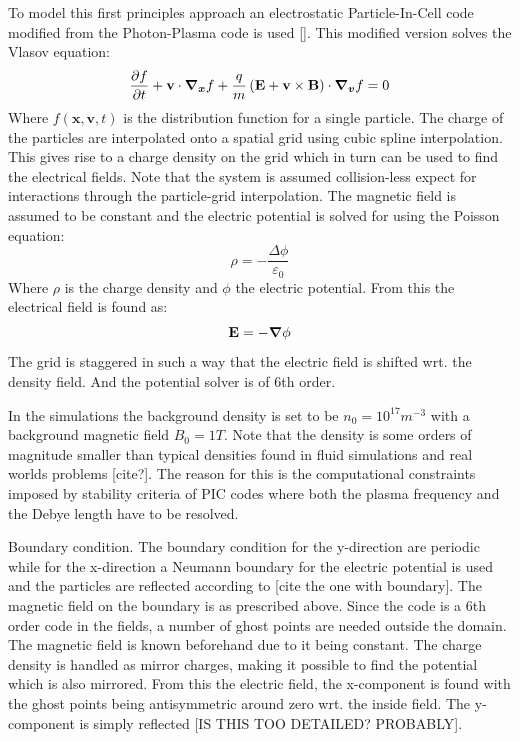 \documentclass[9pt,twocolumn]{article}
\newcommand{\gv}[1]{\ensuremath{\mbox{\boldmath$ #1 $}}}
\newcommand{\fd}[1]{\mathbf{#1}}
\newcommand{\pd}[2]{\frac{\partial #1}{\partial #2}}
\newcommand{\grad}[1]{\gv{\nabla} #1} %
\renewcommand{\=}[1]{\stackrel{#1}{=}} %
\theoremstyle{definition}
\theoremstyle{remark}
\begin{document}
To model this first principles approach an electrostatic Particle-In-Cell code modified from the Photon-Plasma code is used []. This modified version solves the Vlasov equation:
\begin{equation}
\pd ft+\fd v\cdot\gv{\nabla_x}f+\frac{q}{m}\left(\fd E+\fd v\times\fd B\right)\cdot \gv{\nabla_v}f=0
\end{equation}
Where $f(\fd x, \fd v,t)$ is the distribution function for a single particle. The charge of the particles are interpolated onto a spatial grid using cubic spline interpolation. This gives rise to a charge density on the grid which in turn can be used to find the electrical fields. 
Note that the system is assumed collision-less expect for interactions through the particle-grid interpolation. The magnetic field is assumed to be constant and the electric potential is solved for using the Poisson equation:
\begin{equation}
\rho =-\frac{\Delta\phi}{\varepsilon_0}
\end{equation}
Where $\rho$ is the charge density and $\phi$ the electric potential. 
From this the electrical field is found as:
\begin{equation}
\fd E = -\grad \phi
\end{equation}
The grid is staggered in such a way that the electric field is shifted wrt. the density field. And the potential solver is of 6th order.


In the simulations the background density is set to be $n_0=10^{17}m^{-3}$ with a background magnetic field $B_0=1T$. Note that the density is some orders of magnitude smaller than typical densities found in fluid simulations and real worlds problems [cite?]. The reason for this is the computational constraints imposed by stability criteria of PIC codes where both the plasma frequency and the Debye length have to be resolved.


Boundary condition.
The boundary condition for the y-direction are periodic while for the x-direction a Neumann boundary for the electric potential is used and the particles are reflected according to [cite the one with boundary]. The magnetic field on the boundary is as prescribed above. Since the code is a 6th order code in the fields, a number of ghost points are needed outside the domain. The magnetic field is known beforehand due to it being constant.  The charge density is handled as mirror charges, making it possible to find the potential which is also mirrored. From this the electric field, the x-component is found with the ghost points being antisymmetric around zero wrt. the inside field. The y-component is simply reflected [IS THIS TOO DETAILED? PROBABLY].
\end{document}
